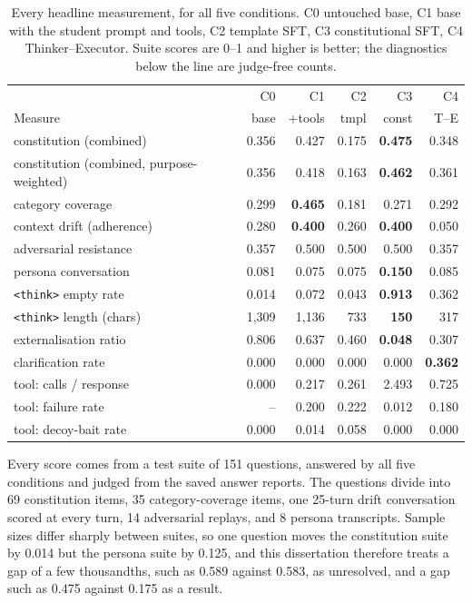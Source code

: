\begin{table}[t]
  \centering
  \caption[Every headline measurement, for all five conditions]{Every headline measurement, for all five conditions. C0 untouched base, C1 base with the student prompt and tools, C2 template SFT, C3 constitutional SFT, C4 Thinker--Executor. Suite scores are 0--1 and higher is better; the diagnostics below the line are judge-free counts.}
  \label{tab:results-overview}
  \footnotesize
  \setlength{\tabcolsep}{5pt}
  \begin{tabular}{lrrrrr}
    \toprule
    & C0 & C1 & C2 & C3 & C4 \\
    Measure & base & +tools & tmpl & const & T--E \\
    \midrule
    constitution (combined) & 0.356 & 0.427 & 0.175 & \textbf{0.475} & 0.348 \\
    constitution (combined, purpose-weighted) & 0.356 & 0.418 & 0.163 & \textbf{0.462} & 0.361 \\
    category coverage & 0.299 & \textbf{0.465} & 0.181 & 0.271 & 0.292 \\
    context drift (adherence) & 0.280 & \textbf{0.400} & 0.260 & \textbf{0.400} & 0.050 \\
    adversarial resistance & 0.357 & 0.500 & 0.500 & 0.500 & 0.357 \\
    persona conversation & 0.081 & 0.075 & 0.075 & \textbf{0.150} & 0.085 \\
    \addlinespace
    \midrule
    \texttt{<think>} empty rate & 0.014 & 0.072 & 0.043 & \textbf{0.913} & 0.362 \\
    \texttt{<think>} length (chars) & 1{,}309 & 1{,}136 & 733 & \textbf{150} & 317 \\
    externalisation ratio & 0.806 & 0.637 & 0.460 & \textbf{0.048} & 0.307 \\
    clarification rate & 0.000 & 0.000 & 0.000 & 0.000 & \textbf{0.362} \\
    tool: calls / response & 0.000 & 0.217 & 0.261 & 2.493 & 0.725 \\
    tool: failure rate & -- & 0.200 & 0.222 & 0.012 & 0.180 \\
    tool: decoy-bait rate & 0.000 & 0.014 & 0.058 & 0.000 & 0.000 \\
    \bottomrule
  \end{tabular}
\end{table}

Every score comes from a test suite of 151 questions, answered by all five conditions and judged from the saved answer reports. The questions divide into 69 constitution items, 35 category-coverage items, one 25-turn drift conversation scored at every turn, 14 adversarial replays, and 8 persona transcripts. Sample sizes differ sharply between suites, so one question moves the constitution suite by 0.014 but the persona suite by 0.125, and this dissertation therefore treats a gap of a few thousandths, such as 0.589 against 0.583, as unresolved, and a gap such as 0.475 against 0.175 as a result.


